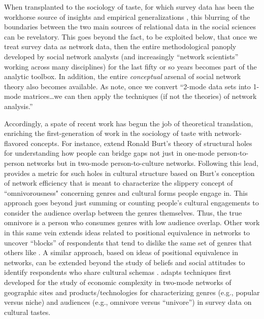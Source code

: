\documentclass[a4paper,12pt]{extarticle}
\begin{document}
When transplanted to the sociology of taste, for which survey data has been the workhorse source of insights and empirical generalizations \citep{peterson_kern96, bryson96, vaneijck01,savage_gayo11}, this blurring of the boundaries between the two main sources of relational data in the social sciences can be revelatory. This goes beyond the fact, to be exploited below, that once we treat survey data as network data, then the entire methodological panoply developed by social network analysts (and increasingly ``network scientists'' working across many disciplines) for the last fifty or so years becomes part of the analytic toolbox. In addition, the entire \textit{conceptual} arsenal of social network theory \citep{borgatti11} also becomes available. As \citet[244]{borgatti_everett97} note, once we convert ``2-mode data sets into 1-mode matrices{\dots}we can then apply the techniques (if not the theories) of network analysis.''

Accordingly, a spate of recent work has begun the job of theoretical translation, enriching the first-generation of work in the sociology of taste with network-flavored concepts. For instance, \citet{pachucki2010cultural} extend Ronald Burt's theory of structural holes for understanding how people can bridge gaps not just in one-mode person-to-person networks but in two-mode person-to-culture networks. Following this lead, \citet{lizardo14} provides a metric for such holes in cultural structure based on Burt's conception of network efficiency that is meant to characterize the slippery concept of ``omnivorousness" concerning genres and cultural forms people engage in. This approach goes beyond just summing or counting people's cultural engagements to consider the audience overlap between the genres themselves. Thus, the true omnivore is a person who consumes genres with low audience overlap. Other work in this same vein extends ideas related to positional equivalence in networks \citet{breiger1976social} to uncover ``blocks'' of respondents that tend to dislike the same set of genres that others like \citep{okada2017structure}. A similar approach, based on ideas of positional equivalence in networks, can be extended beyond the study of beliefs and social attitudes to identify respondents who share cultural schemas \citep{goldberg2011mapping}. \citet{lizardo18} adapts techniques first developed for the study of economic complexity in two-mode networks of geographic sites and products/technologies \citep{hidalgo2009building} for characterizing genres (e.g., popular versus niche) and audiences (e.g., omnivore versus ``univore'') in survey data on cultural tastes. 
\end{document}
